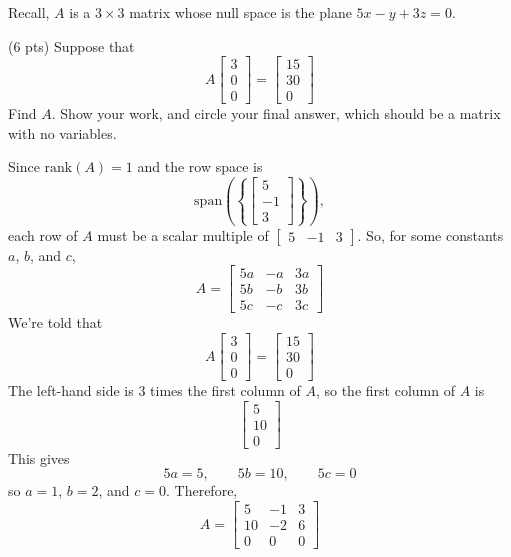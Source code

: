 \documentclass[11pt]{article}
\begin{document}
\begin{prob}[(16 pts)]
\newpage

Recall, $A$ is a $3 \times 3$ matrix whose null space is the plane $5x-y+3z=0$.

\begin{subprob}(6 pts) Suppose that $$A \begin{bmatrix} 3 \\ 0 \\ 0 \end{bmatrix} = \begin{bmatrix} 15 \\ 30 \\ 0 \end{bmatrix}$$ Find $A$. Show your work, and $\boxed{\text{circle}}$ your final answer, which should be a matrix with no variables. \\

\emptybox{15cm}

\begin{solution}
Since $\text{rank}(A)=1$ and the row space is
\[
\text{span}\left( \left\{ \begin{bmatrix} 5 \\ -1 \\ 3 \end{bmatrix} \right\} \right),
\]
each row of $A$ must be a scalar multiple of $\begin{bmatrix} 5 & -1 & 3 \end{bmatrix}$. So, for some constants $a$, $b$, and $c$,
\[
A =
\begin{bmatrix}
5a & -a & 3a \\
5b & -b & 3b \\
5c & -c & 3c
\end{bmatrix}
\]
We're told that
\[
A \begin{bmatrix} 3 \\ 0 \\ 0 \end{bmatrix}
=
\begin{bmatrix} 15 \\ 30 \\ 0 \end{bmatrix}
\]
The left-hand side is 3 times the first column of $A$, so the first column of $A$ is
\[
\begin{bmatrix} 5 \\ 10 \\ 0 \end{bmatrix}
\]
This gives
\[
5a = 5, \qquad 5b = 10, \qquad 5c = 0
\]
so $a=1$, $b=2$, and $c=0$. Therefore,
\[
A =
\begin{bmatrix}
5 & -1 & 3 \\
10 & -2 & 6 \\
0 & 0 & 0
\end{bmatrix}
\]
\end{solution}
\end{subprob}

\end{prob}
\end{document}
